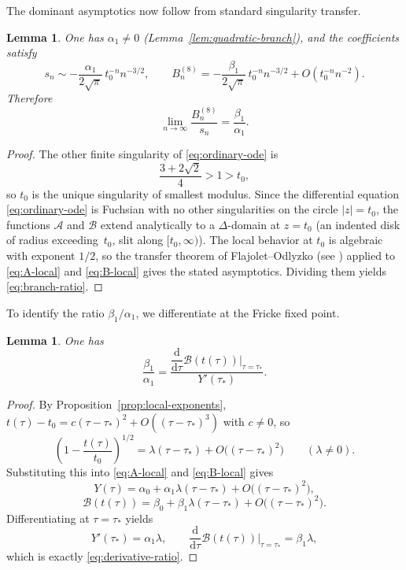 \documentclass[11pt]{amsart}
\numberwithin{equation}{section}
\theoremstyle{plain}
\newtheorem{lemma}[theorem]{Lemma}
\theoremstyle{definition}
\theoremstyle{remark}
\newcommand{\dd}{\mathrm{d}}
\begin{document}
The dominant asymptotics now follow from standard singularity transfer.

\begin{lemma}\label{lem:transfer}
One has $\alpha_1\neq 0$ (Lemma~\ref{lem:quadratic-branch}), and the coefficients satisfy
\[
s_n\sim -\frac{\alpha_1}{2\sqrt\pi}\,t_0^{-n}n^{-3/2},
\qquad
B_n^{(8)}= -\frac{\beta_1}{2\sqrt\pi}\,t_0^{-n}n^{-3/2}+O(t_0^{-n}n^{-2}).
\]
Therefore
\begin{equation}\label{eq:branch-ratio}
\lim_{n\to\infty}\frac{B_n^{(8)}}{s_n}=\frac{\beta_1}{\alpha_1}.
\end{equation}
\end{lemma}

\begin{proof}
The other finite singularity of \eqref{eq:ordinary-ode} is
\[
\frac{3+2\sqrt2}{4}>1>t_0,
\]
so $t_0$ is the unique singularity of smallest modulus. Since the differential equation \eqref{eq:ordinary-ode} is Fuchsian with no other singularities on the circle $|z|=t_0$, the functions $\mathcal A$ and $\mathcal B$ extend analytically to a $\Delta$-domain at $z=t_0$ (an indented disk of radius exceeding~$t_0$, slit along $[t_0,\infty)$). The local behavior at $t_0$ is algebraic with exponent $1/2$, so the transfer theorem of Flajolet--Odlyzko (see \cite[Theorem~VI.1]{FlajoletSedgewick}) applied to \eqref{eq:A-local} and \eqref{eq:B-local} gives the stated asymptotics. Dividing them yields \eqref{eq:branch-ratio}.
\end{proof}

To identify the ratio $\beta_1/\alpha_1$, we differentiate at the Fricke fixed point.

\begin{lemma}\label{lem:derivative-ratio}
One has
\begin{equation}\label{eq:derivative-ratio}
\frac{\beta_1}{\alpha_1}
=\frac{\dfrac{\dd}{\dd\tau}\mathcal B(t(\tau))\big|_{\tau=\tau_*}}{Y'(\tau_*)}.
\end{equation}
\end{lemma}

\begin{proof}
By Proposition~\ref{prop:local-exponents}, $t(\tau)-t_0=c(\tau-\tau_*)^2+O((\tau-\tau_*)^3)$ with $c\neq 0$, so
\[
\left(1-\frac{t(\tau)}{t_0}\right)^{1/2}=\lambda(\tau-\tau_*)+O\bigl((\tau-\tau_*)^2\bigr)
\qquad(\lambda\neq 0).
\]
Substituting this into \eqref{eq:A-local} and \eqref{eq:B-local} gives
\[
Y(\tau)=\alpha_0+\alpha_1\lambda(\tau-\tau_*)+O\bigl((\tau-\tau_*)^2\bigr),
\]
\[
\mathcal B(t(\tau))=\beta_0+\beta_1\lambda(\tau-\tau_*)+O\bigl((\tau-\tau_*)^2\bigr).
\]
Differentiating at $\tau=\tau_*$ yields
\[
Y'(\tau_*)=\alpha_1\lambda,
\qquad
\frac{\dd}{\dd\tau}\mathcal B(t(\tau))\Big|_{\tau=\tau_*}=\beta_1\lambda,
\]
which is exactly \eqref{eq:derivative-ratio}.
\end{proof}
\end{document}
